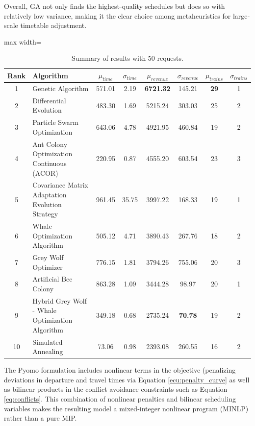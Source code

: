 \documentclass[Afour,sagev,times]{sagej}
\begin{document}
Overall, GA not only finds the highest‐quality schedules but does so with relatively low variance, making it the clear choice among metaheuristics for large‐scale timetable adjustment.  

\begin{table}[htbp]
\centering
\caption{Summary of results with 50 requests.}
\begin{adjustbox}{max width=\textwidth}
\begin{tabular}{|c|l|c|c|c|c|c|c|}
\hline
\textbf{Rank} & \textbf{Algorithm} & \(\mu_{time}\) & \(\sigma_{time}\) & \(\mu_{revenue}\) & \(\sigma_{revenue}\) & \(\mu_{trains}\) & \(\sigma_{trains}\) \\ \hline \hline
1 & Genetic Algorithm                                     & 571.01 &   2.19 & \textbf{6721.32} & 145.21 & \textbf{29} & 1 \\ \hline
2 & Differential Evolution                                 & 483.30 &   1.69 & 5215.24 & 303.03 & 25 & 2 \\ \hline
3 & Particle Swarm Optimization                            & 643.06 &   4.78 & 4921.95 & 460.84 & 19 & 2 \\ \hline
4 & Ant Colony Optimization Continuous (ACOR)              & 220.95 &   0.87 & 4555.20 & 603.54 & 23 & 3 \\ \hline
5 & Covariance Matrix Adaptation Evolution Strategy        & 961.45 &  35.75 & 3997.22 & 168.33 & 19 & 1 \\ \hline
6 & Whale Optimization Algorithm                           & 505.12 &   4.71 & 3890.43 & 267.76 & 18 & 2 \\ \hline
7 & Grey Wolf Optimizer                                    & 776.15 &   1.81 & 3794.26 & 755.06 & 20 & 3 \\ \hline
8 & Artificial Bee Colony                                  & 863.28 &   1.09 & 3444.28 &  98.97 & 20 & 1 \\ \hline
9 & Hybrid Grey Wolf - Whale Optimization Algorithm        & 349.18 &   0.68 & 2735.24 &  \textbf{70.78} & 19 & 2 \\ \hline
10 & Simulated Annealing                                   &  73.06 &   0.98 & 2393.08 & 260.55 & 16 & 2 \\ \hline
\end{tabular}
\end{adjustbox}
\label{tab:summary_results_50}
\end{table}

The Pyomo formulation includes nonlinear terms in the objective (penalizing deviations in departure and travel times via Equation \ref{ecu:penalty_curve} as well as bilinear products in the conflict‐avoidance constraints such as Equation \ref{eq:conflicts}. This combination of nonlinear penalties and bilinear scheduling variables makes the resulting model a mixed‐integer nonlinear program (MINLP) rather than a pure MIP.
\end{document}
